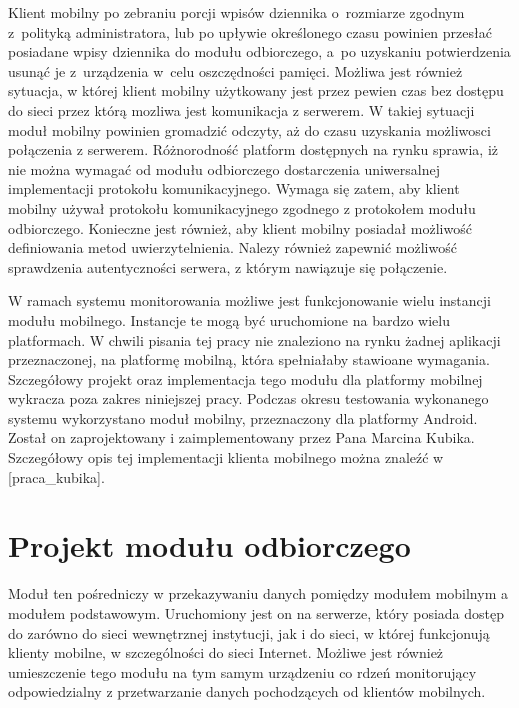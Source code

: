 Klient mobilny po zebraniu porcji wpisów dziennika o~rozmiarze zgodnym
z~polityką administratora, lub po upływie określonego czasu powinien
przesłać posiadane wpisy dziennika do modułu odbiorczego, a~po
uzyskaniu potwierdzenia usunąć je z~urządzenia w~celu oszczędności
pamięci. Możliwa jest również sytuacja, w której klient mobilny
użytkowany jest przez pewien czas bez dostępu do sieci przez którą
mozliwa jest komunikacja z serwerem. W takiej sytuacji moduł mobilny
powinien gromadzić odczyty, aż do czasu uzyskania możliwosci
połączenia z serwerem. Różnorodność platform dostępnych na rynku
sprawia, iż nie można wymagać od modułu odbiorczego dostarczenia
uniwersalnej implementacji protokołu komunikacyjnego. Wymaga się
zatem, aby klient mobilny używał protokołu komunikacyjnego zgodnego z
protokołem modułu odbiorczego. Konieczne jest również, aby klient
mobilny posiadał możliwość definiowania metod uwierzytelnienia. Nalezy
również zapewnić możliwość sprawdzenia autentyczności serwera, z
którym nawiązuje się połączenie.

W ramach systemu monitorowania możliwe jest funkcjonowanie wielu
instancji modułu mobilnego. Instancje te mogą być uruchomione na
bardzo wielu platformach. W chwili pisania tej pracy nie znaleziono na
rynku żadnej aplikacji przeznaczonej, na platformę mobilną, która
spełniałaby stawioane wymagania. Szczegółowy projekt oraz
implementacja tego modułu dla platformy mobilnej wykracza poza zakres
niniejszej pracy. Podczas okresu testowania wykonanego systemu
wykorzystano moduł mobilny, przeznaczony dla platformy Android. Został
on zaprojektowany i zaimplementowany przez Pana Marcina
Kubika. Szczegółowy opis tej implementacji klienta mobilnego można
znaleźć w [praca\_kubika].

\section[Projekt modułu odbiorczego][Projekt modułu odbiorczego]{Projekt modułu odbiorczego}

Moduł ten pośredniczy w przekazywaniu danych pomiędzy modułem mobilnym
a modułem podstawowym. Uruchomiony jest on na serwerze, który posiada
dostęp do zarówno do sieci wewnętrznej instytucji, jak i do sieci, w
której funkcjonują klienty mobilne, w szczególności do sieci
Internet. Możliwe jest również umieszczenie tego modułu na tym samym
urządzeniu co rdzeń monitorujący odpowiedzialny z przetwarzanie danych
pochodzących od klientów mobilnych.

